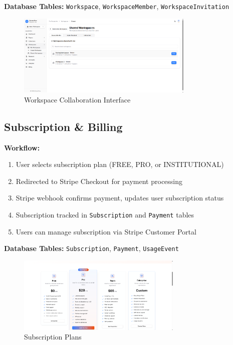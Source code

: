 \textbf{Database Tables:} \texttt{Workspace}, \texttt{WorkspaceMember}, \texttt{WorkspaceInvitation}

\begin{figure}[H]
\centering
\includegraphics[width=0.75\textwidth]{images/screenshots/shared_workspace.png}
\caption{Workspace Collaboration Interface}
\label{fig:workspace}
\end{figure}

\subsection{Subscription \& Billing}

\textbf{Workflow:}
\begin{enumerate}[leftmargin=*,topsep=3pt,itemsep=2pt]
    \item User selects subscription plan (FREE, PRO, or INSTITUTIONAL)
    \item Redirected to Stripe Checkout for payment processing
    \item Stripe webhook confirms payment, updates user subscription status
    \item Subscription tracked in \texttt{Subscription} and \texttt{Payment} tables
    \item Users can manage subscription via Stripe Customer Portal
\end{enumerate}

\textbf{Database Tables:} \texttt{Subscription}, \texttt{Payment}, \texttt{UsageEvent}

\begin{figure}[H]
\centering
\includegraphics[width=0.7\textwidth]{images/screenshots/billing_plan.png}
\caption{Subscription Plans}
\label{fig:billing}
\end{figure}

